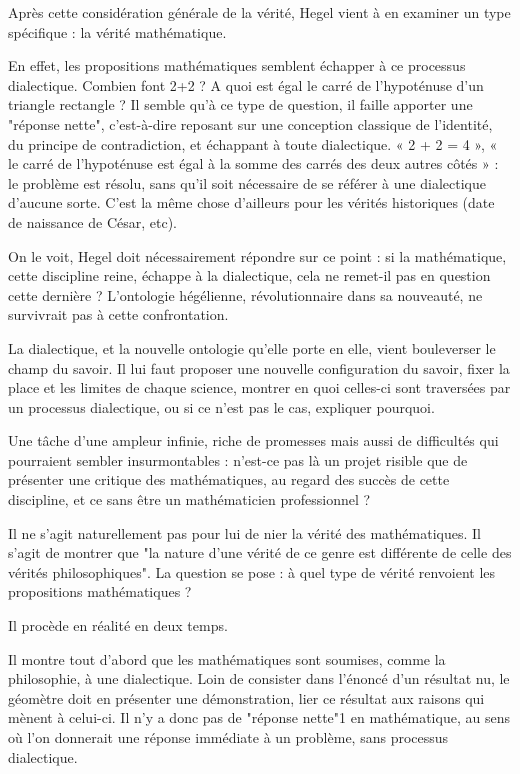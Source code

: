 Après cette considération générale de la vérité, Hegel vient à en examiner un type spécifique : la vérité mathématique.

En effet, les propositions mathématiques semblent échapper à ce processus dialectique. Combien font 2+2 ? A quoi est égal le carré de l’hypoténuse d’un triangle rectangle ? Il semble qu’à ce type de question, il faille apporter une "réponse nette", c’est-à-dire reposant sur une conception classique de l’identité, du principe de contradiction, et échappant à toute dialectique. « 2 + 2 = 4 », « le carré de l’hypoténuse est égal à la somme des carrés des deux autres côtés » : le problème est résolu, sans qu’il soit nécessaire de se référer à une dialectique d’aucune sorte. C’est la même chose d’ailleurs pour les vérités historiques (date de naissance de César, etc).

On le voit, Hegel doit nécessairement répondre sur ce point : si la mathématique, cette discipline reine, échappe à la dialectique, cela ne remet-il pas en question cette dernière ? L’ontologie hégélienne, révolutionnaire dans sa nouveauté, ne survivrait pas à cette confrontation.

La dialectique, et la nouvelle ontologie qu’elle porte en elle, vient bouleverser le champ du savoir. Il lui faut proposer une nouvelle configuration du savoir, fixer la place et les limites de chaque science, montrer en quoi celles-ci sont traversées par un processus dialectique, ou si ce n’est pas le cas, expliquer pourquoi.

Une tâche d’une ampleur infinie, riche de promesses mais aussi de difficultés qui pourraient sembler insurmontables : n’est-ce pas là un projet risible que de présenter une critique des mathématiques, au regard des succès de cette discipline, et ce sans être un mathématicien professionnel ?

Il ne s’agit naturellement pas pour lui de nier la vérité des mathématiques. Il s’agit de montrer que "la nature d’une vérité de ce genre est différente de celle des vérités philosophiques". La question se pose : à quel type de vérité renvoient les propositions mathématiques ?

Il procède en réalité en deux temps.

Il montre tout d’abord que les mathématiques sont soumises, comme la philosophie, à une dialectique. Loin de consister dans l’énoncé d’un résultat nu, le géomètre doit en présenter une démonstration, lier ce résultat aux raisons qui mènent à celui-ci. Il n’y a donc pas de "réponse nette"1 en mathématique, au sens où l’on donnerait une réponse immédiate à un problème, sans processus dialectique.

